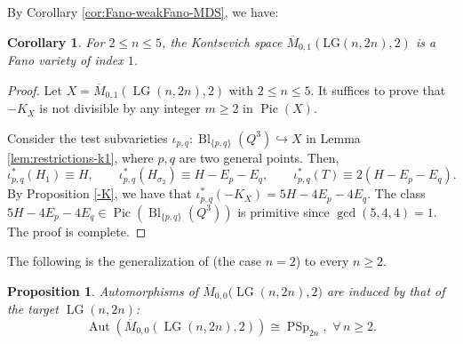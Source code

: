 \documentclass[10pt]{amsart}
\newtheorem{proposition}[theorem]{Proposition}
\newtheorem{corollary}[theorem]{Corollary}
\theoremstyle{definition}
\newcommand{\Pic}{\operatorname{Pic}}
\newcommand{\Aut}{\operatorname{Aut}}
\newcommand{\LG}{\operatorname{LG}}
\newcommand{\Bl}{\operatorname{Bl}}
\DeclareMathOperator{\PSp}{PSp}
\theoremstyle{plain} %
\begin{document}
By Corollary \ref{cor:Fano-weakFano-MDS}, we have:
\begin{corollary}\label{rem:Fano-index}
For $2\le n\le 5$, the Kontsevich space $\overline{M}_{0,1}(\mathrm{LG}(n,2n),2)$ is a Fano variety of index $1$.    
\end{corollary}
\begin{proof}
Let \(X = \overline{M}_{0,1}(\LG(n,2n),2)\) with \(2\leq n\leq 5\). 
It suffices to prove that \(-K_{X}\) is not divisible by any integer \(m\geq 2\) in \(\Pic(X)\). 

Consider the test subvarieties $\iota_{p,q}:\Bl_{\{p,q\}}(Q^{3})\hookrightarrow X$ in Lemma \ref{lem:restrictions-k1}, where  $p,q$ are two general points. 
Then, \begin{equation*}%
\iota_{p,q}^*(H_1) \equiv H,\qquad\iota_{p,q}^*(H_{\sigma_2})\equiv H-E_p-E_q,\qquad\iota_{p,q}^*(T)\equiv 2(H-E_p-E_q).  \end{equation*} 
By Proposition \ref{-K},  we have that
\(
\iota_{p,q}^{*}(-K_{X}) = 5H - 4E_{p} - 4E_{q}.
\) The class \(5H - 4E_{p} - 4E_{q}\in \Pic(\Bl_{\{p,q\}}(Q^{3}))\) is primitive since \(\gcd(5,4,4) = 1\). The proof is complete. 
\end{proof}


The following is the generalization of \cite[Corollary 6.18]{CM} (the case $n=2$) to every $n\geq 2$.

\begin{proposition}\label{prop:AutKontsevichConicsLG}
Automorphisms of $\overline{M}_{0,0}\big(\LG(n,2n),2\big)$ are induced by that of the target $\LG(n,2n)$:
\[
\Aut(\overline{M}_{0,0}(\LG(n,2n),2))\cong\PSp_{2n},\,\,\forall\, n\geq2.
\]
\end{proposition}
\end{document}
